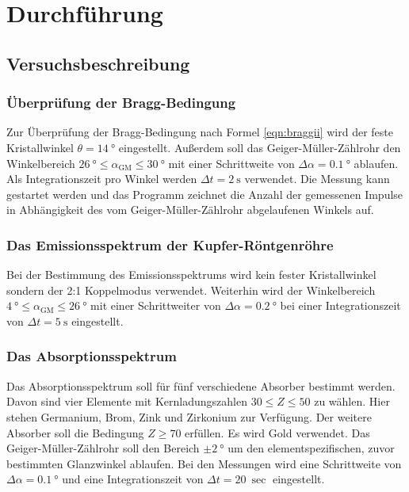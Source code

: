 \section{Durchführung}
\label{sec:Durchführung}



\FloatBarrier
\subsection{Versuchsbeschreibung}
\label{sec:Versuchsbeschreibung}

\subsubsection{Überprüfung der Bragg-Bedingung}
Zur Überprüfung der Bragg-Bedingung nach Formel \eqref{eqn:braggii} wird der feste Kristallwinkel
$\theta = \SI{14}{\degree}$ eingestellt. Außerdem soll das Geiger-Müller-Zählrohr den
Winkelbereich ${\SI{26}{\degree} \le \alpha_{\mathrm{GM}} \le \SI{30}{\degree}}$ mit einer
Schrittweite von $\Delta \alpha = \SI{0,1}{\degree}$ ablaufen. Als Integrationszeit pro
Winkel werden $\Delta t = \SI{2}{\second}$ verwendet.
Die Messung kann gestartet werden und das Programm zeichnet die Anzahl der gemessenen Impulse
in Abhängigkeit des vom Geiger-Müller-Zählrohr abgelaufenen Winkels auf.
\subsubsection{Das Emissionsspektrum der Kupfer-Röntgenröhre}
Bei der Bestimmung des Emissionsspektrums wird kein fester Kristallwinkel sondern der
2:1 Koppelmodus verwendet.
Weiterhin wird der Winkelbereich $\SI{4}{\degree} \le \alpha_{\mathrm{GM}} \le \SI{26}{\degree}$
mit einer Schrittweiter von $\Delta \alpha = \SI{0,2}{\degree}$ bei einer Integrationszeit
von $\Delta t = \SI{5}{\second}$ eingestellt.
\subsubsection{Das Absorptionsspektrum}
Das Absorptionsspektrum soll für fünf verschiedene Absorber bestimmt werden. Davon sind
vier Elemente mit Kernladungszahlen $30 \le Z \le 50$ zu wählen. Hier stehen Germanium,
Brom, Zink und Zirkonium zur Verfügung. Der weitere Absorber soll die Bedingung $Z \ge 70$
erfüllen. Es wird Gold verwendet.
Das Geiger-Müller-Zählrohr soll den Bereich $\pm \SI{2}{\degree}$ um den elementspezifischen,
zuvor bestimmten Glanzwinkel ablaufen.
Bei den Messungen wird eine Schrittweite von $\Delta \alpha = \SI{0,1}{\degree}$ und
eine Integrationszeit von $\Delta t = \SI{20}{\sec}$ eingestellt.
